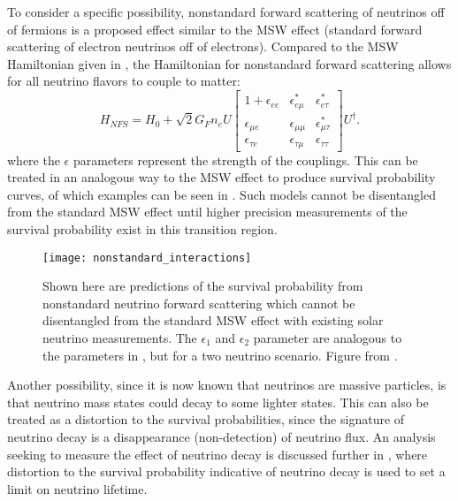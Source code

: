 To consider a specific possibility, nonstandard forward scattering \cite{nonstandard_forward_scatter} of neutrinos off of fermions is a proposed effect similar to the MSW effect (standard forward scattering of electron neutrinos off of electrons).
Compared to the MSW Hamiltonian given in , the Hamiltonian for nonstandard forward scattering allows for all neutrino flavors to couple to matter:
\begin{equation}
H_{NFS} = H_{0} + \sqrt{2} G_F n_e U\begin{bmatrix}
1+\epsilon_{ee} & \epsilon_{e\mu}^* & \epsilon_{e\tau}^* \\
\epsilon_{\mu e} & \epsilon_{\mu\mu} & \epsilon_{\mu\tau}^* \\
\epsilon_{\tau e} & \epsilon_{\tau\mu} & \epsilon_{\tau\tau}
\end{bmatrix}U^\dagger.
\label{eq:nsi}
\end{equation}
where the $\epsilon$ parameters represent the strength of the couplings.
This can be treated in an analogous way to the MSW effect to produce survival probability curves, of which examples can be seen in .
Such models cannot be disentangled from the standard MSW effect until higher precision measurements of the survival probability exist in this transition region.

\begin{figure}
\centering
\texttt{[image: nonstandard\_interactions]}
\caption{\label{fig:nonstandard}Shown here are predictions of the survival probability from nonstandard neutrino forward scattering which cannot be disentangled from the standard MSW effect with existing solar neutrino measurements. The $\epsilon_1$ and $\epsilon_2$ parameter are analogous to the parameters in , but for a two neutrino scenario. Figure from \cite{nonstandard_interactions}.}
\end{figure}

Another possibility, since it is now known that neutrinos are massive particles, is that neutrino mass states could decay to some lighter states.
This can also be treated as a distortion to the survival probabilities, since the signature of neutrino decay is a disappearance (non-detection) of neutrino flux.
An analysis seeking to measure the effect of neutrino decay is discussed further in , where distortion to the survival probability indicative of neutrino decay is used to set a limit on neutrino lifetime.

